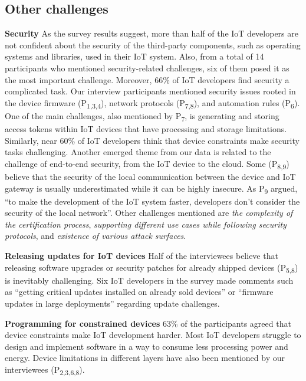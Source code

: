 \subsection{Other challenges}
\textbf{Security}
As the survey results suggest, more than half of the IoT developers are not confident about the security of the third-party components, such as operating systems and libraries, used in their IoT system. Also, from a total of 14 participants who mentioned security-related challenges, six of them posed it as the most important challenge. Moreover, 66\% of IoT developers find security a complicated task. Our interview participants mentioned security issues rooted in the device firmware (P\textsubscript{1,3,4}), network protocols (P\textsubscript{7,8}), and automation rules (P\textsubscript{6}). One of the main challenges, also mentioned by P\textsubscript{7}, is generating and storing access tokens within IoT devices that have processing and storage limitations. Similarly, near 60\% of IoT developers think that device constraints make security tasks challenging. Another emerged theme from our data is related to the challenge of end-to-end security, from the IoT device to the cloud. Some (P\textsubscript{8,9}) believe that the security of the local communication between the device and IoT gateway is usually underestimated while it can be highly insecure. As P\textsubscript{9} argued, \enquote{to make the development of the IoT system faster, developers don't consider the security of the local network}. Other challenges mentioned are \emph{the complexity of the certification process}, \emph{supporting different use cases while following security protocols}, and \emph{existence of various attack surfaces}.

\textbf{Releasing updates for IoT devices}  Half of the interviewees believe that releasing software upgrades or security patches for already shipped devices (P\textsubscript{5,8}) is inevitably challenging. Six IoT developers in the survey made comments such as \enquote{getting critical updates installed on already sold devices} or \enquote{firmware updates in large deployments} regarding update challenges.

\textbf{Programming for constrained devices}
63\% of the participants agreed that device constraints make IoT development harder. Most IoT developers struggle to design and implement software in a way to consume less processing power and energy. Device limitations in different layers have also been mentioned by our interviewees (P\textsubscript{2,3,6,8}).

